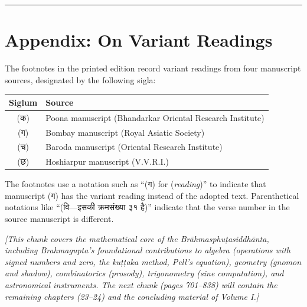 \documentclass[11pt,a4paper]{article}
\newcommand{\longline}{\noindent\rule{\textwidth}{0.4pt}}
\newcommand{\cnote}[1]{\textcolor{notecolor}{\textit{#1}}}
\begin{document}
\vspace{1cm}
\longline

\newpage
\section*{Appendix: On Variant Readings}

The footnotes in the printed edition record variant readings from
four manuscript sources, designated by the following sigla:

\begin{center}
\begin{tabular}{cl}
\toprule
\textbf{Siglum} & \textbf{Source} \\
\midrule
(क) & Poona manuscript (Bhandarkar Oriental Research Institute) \\
(ग) & Bombay manuscript (Royal Asiatic Society) \\
(च) & Baroda manuscript (Oriental Research Institute) \\
(छ) & Hoshiarpur manuscript (V.V.R.I.) \\
\bottomrule
\end{tabular}
\end{center}

\vspace{0.5cm}

The footnotes use a notation such as ``(ग) for (\textit{reading})''
to indicate that manuscript (ग) has the variant reading instead of
the adopted text. Parenthetical notations like ``(वि—इसकी क्रमसंख्या
३१ है)'' indicate that the verse number in the source manuscript is
different.

\vspace{0.5cm}

\cnote{[This chunk covers the mathematical core of the
\textit{Brāhmasphuṭasiddhānta}, including Brahmagupta's foundational
contributions to algebra (operations with signed numbers and zero, the
kuṭṭaka method, Pell's equation), geometry (gnomon and shadow),
combinatorics (prosody), trigonometry (sine computation), and
astronomical instruments. The next chunk (pages 701–838) will contain the remaining chapters (23–24) and the concluding material of Volume
I.]}
\end{document}
